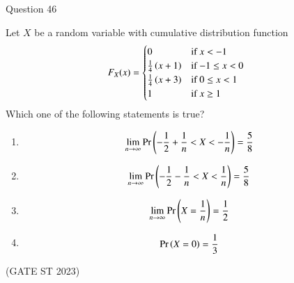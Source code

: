 \documentclass[journal,12pt,twocolumn]{IEEEtran}
\theoremstyle{remark}
\begin{document}
Question 46

Let $X$ be a random variable with cumulative distribution function
\begin{align}
F_X(x) &= 
	\begin{cases}
		0 & \text{if $x < -1$}\\
		\frac{1}{4}\left(x+1\right) & \text{if $-1 \leq x < 0$}\\
		\frac{1}{4}\left(x+3\right) & \text{if $0 \leq x < 1$}\\
		1 & \text{if $ x \geq 1$}\\
	\end{cases}
\end{align}
Which one of the following statements is true?
\begin{enumerate}[label=(\Alph*)]
    \item\begin{align} \lim_{n \to \infty} \Pr\left(-\frac{1}{2} + \frac{1}{n} < X < -\frac{1}{n}\right) = \frac{5}{8}\end{align}
    \item \begin{align}\lim_{n \to \infty} \Pr\left(-\frac{1}{2} - \frac{1}{n} < X < \frac{1}{n}\right) = \frac{5}{8}\end{align}
    \item \begin{align}\lim_{n \to \infty} \Pr\left(X = \frac{1}{n}\right) = \frac{1}{2}\end{align}
    \item \begin{align}\Pr\left(X = 0\right) = \frac{1}{3}\end{align}
\end{enumerate}

\hfill(GATE ST 2023)
\end{document}
